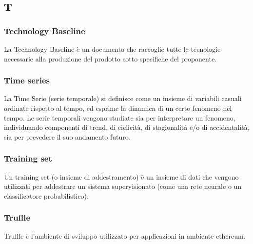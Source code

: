 \subsection*{\textbf{\hfill \Huge{T} \hfill}} 
\subsubsection*{Technology Baseline}
La Technology Baseline è un documento che raccoglie tutte le tecnologie necessarie alla produzione del prodotto sotto specifiche del proponente.
\subsubsection*{Time series}
La Time Serie (serie temporale) si definisce come un insieme di variabili casuali ordinate rispetto al tempo, ed esprime la dinamica di un certo fenomeno nel tempo. Le serie temporali vengono studiate sia per interpretare un fenomeno, individuando componenti di trend, di ciclicità, di stagionalità e/o di accidentalità, sia per prevedere il suo andamento futuro. 
\subsubsection*{Training set}
Un training set (o insieme di addestramento) è un insieme di dati che vengono utilizzati per addestrare un sistema supervisionato (come una rete neurale o un classificatore probabilistico).
\subsubsection*{Truffle}
Truffle è l'ambiente di sviluppo utilizzato per applicazioni in ambiente ethereum.
